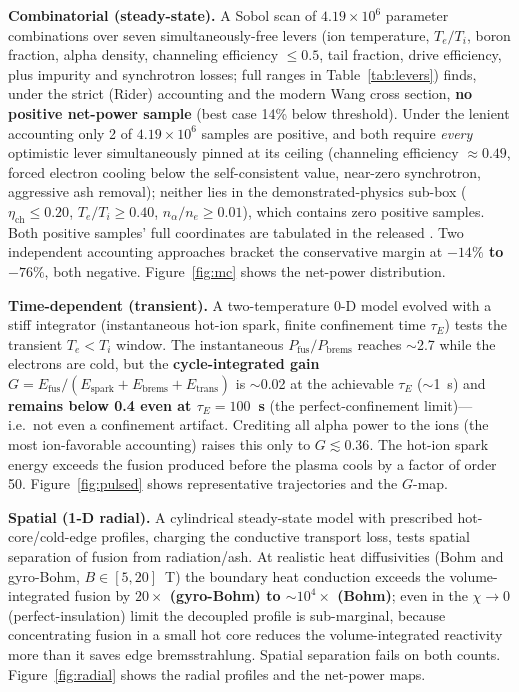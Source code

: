 \documentclass[aip,pop,reprint,amsmath,amssymb,floatfix]{revtex4-2}
\begin{document}
\textbf{Combinatorial (steady-state).} A Sobol scan of \textbf{$4.19\times10^6$} parameter combinations over seven simultaneously-free levers (ion temperature, $T_e/T_i$, boron fraction, alpha density, channeling efficiency $\le 0.5$, tail fraction, drive efficiency, plus impurity and synchrotron losses; full ranges in Table~\ref{tab:levers}) finds, under the strict (Rider) accounting and the modern Wang cross section, \textbf{no positive net-power sample} (best case 14\% below threshold). Under the lenient accounting only 2 of $4.19\times10^6$ samples are positive, and both require \textit{every} optimistic lever simultaneously pinned at its ceiling (channeling efficiency $\approx 0.49$, forced electron cooling below the self-consistent value, near-zero synchrotron, aggressive ash removal); neither lies in the demonstrated-physics sub-box ($\eta_\mathrm{ch} \le 0.20$, $T_e/T_i \ge 0.40$, $n_\alpha/n_e \ge 0.01$), which contains zero positive samples. Both positive samples' full coordinates are tabulated in the released . Two independent accounting approaches bracket the conservative margin at \textbf{$-14\%$ to $-76\%$}, both negative. Figure~\ref{fig:mc} shows the net-power distribution.

\textbf{Time-dependent (transient).} A two-temperature 0-D model evolved with a stiff integrator (instantaneous hot-ion spark, finite confinement time $\tau_E$) tests the transient $T_e<T_i$ window. The instantaneous $P_\mathrm{fus}/P_\mathrm{brems}$ reaches $\sim$2.7 while the electrons are cold, but the \textbf{cycle-integrated gain} $G = E_\mathrm{fus}/(E_\mathrm{spark} + E_\mathrm{brems} + E_\mathrm{trans})$ is $\sim$0.02 at the achievable $\tau_E$ ($\sim$1~s) and \textbf{remains below 0.4 even at $\tau_E = 100$~s} (the perfect-confinement limit)---i.e.\ not even a confinement artifact. Crediting all alpha power to the ions (the most ion-favorable accounting) raises this only to $G \lesssim 0.36$. The hot-ion spark energy exceeds the fusion produced before the plasma cools by a factor of order 50. Figure~\ref{fig:pulsed} shows representative trajectories and the $G$-map.

\textbf{Spatial (1-D radial).} A cylindrical steady-state model with prescribed hot-core/cold-edge profiles, charging the conductive transport loss, tests spatial separation of fusion from radiation/ash. At realistic heat diffusivities (Bohm and gyro-Bohm, $B\in[5,20]$~T) the boundary heat conduction exceeds the volume-integrated fusion by \textbf{$20\times$ (gyro-Bohm) to $\sim\!10^4\times$ (Bohm)}; even in the $\chi\to 0$ (perfect-insulation) limit the decoupled profile is sub-marginal, because concentrating fusion in a small hot core reduces the volume-integrated reactivity more than it saves edge bremsstrahlung. Spatial separation fails on both counts. Figure~\ref{fig:radial} shows the radial profiles and the net-power maps.
\end{document}
